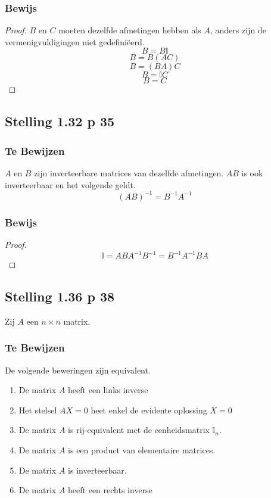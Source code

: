 \documentclass[lineaire_algebra_oplossingen.tex]{subfiles}
\begin{document}
\subsubsection*{Bewijs}
\begin{proof}
$B$ en $C$ moeten dezelfde afmetingen hebben als $A$, anders zijn de vermenigvuldigingen niet gedefini\"eerd.
\[B = B\mathbb{I}\]
\[B = B (AC)\]
\[B = (BA)C\]
\[B = \mathbb{I}C\]
\[B = C\]
\end{proof}

\subsection{Stelling 1.32 p 35}
\subsubsection*{Te Bewijzen}
$A$ en $B$ zijn inverteerbare matrices van dezelfde afmetingen. $AB$ is ook inverteerbaar en het volgende geldt.
\[
(AB)^{-1} = B^{-1}A^{-1}
\]
\subsubsection*{Bewijs}
\begin{proof}
\[\mathbb{I} = ABA^{-1}B^{-1} = B^{-1}A^{-1}BA\]
\end{proof}

\subsection{Stelling 1.36 p 38}
Zij $A$ een $n\times n$ matrix.
\subsubsection*{Te Bewijzen}
De volgende beweringen zijn equivalent.
\begin{enumerate}
\item De matrix $A$ heeft een links inverse
\item Het stelsel $AX = 0$ heet enkel de evidente oplossing $X=0$
\item De matrix $A$ is rij-equivalent met de eenheidsmatrix $\mathbb{I}_n$.
\item De matrix $A$ is een product van elementaire matrices.
\item De matrix $A$ is inverteerbaar.
\item De matrix $A$ heeft een rechts inverse
\end{enumerate}
\end{document}
